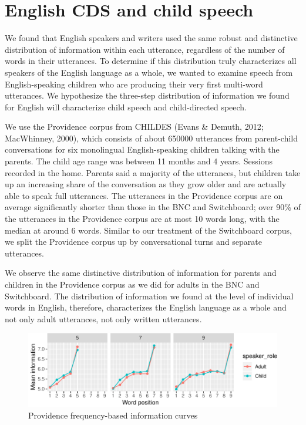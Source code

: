 \documentclass[11pt,]{article}
\begin{document}
\hypertarget{english-cds-and-child-speech}{%
\section{English CDS and child speech}\label{english-cds-and-child-speech}}

We found that English speakers and writers used the same robust and distinctive distribution of information within each utterance, regardless of the number of words in their utterances. To determine if this distribution truly characterizes all speakers of the English language as a whole, we wanted to examine speech from English-speaking children who are producing their very first multi-word utterances. We hypothesize the three-step distribution of information we found for English will characterize child speech and child-directed speech.

We use the Providence corpus from CHILDES (Evans \& Demuth, 2012; MacWhinney, 2000), which consists of about 650000 utterances from parent-child conversations for six monolingual English-speaking children talking with the parents. The child age range was between 11 months and 4 years. Sessions recorded in the home. Parents said a majority of the utterances, but children take up an increasing share of the conversation as they grow older and are actually able to speak full utterances. The utterances in the Providence corpus are on average significantly shorter than those in the BNC and Switchboard; over 90\% of the utterances in the Providence corpus are at most 10 words long, with the median at around 6 words. Similar to our treatment of the Switchboard corpus, we split the Providence corpus up by conversational turns and separate utterances.

We observe the same distinctive distribution of information for parents and children in the Providence corpus as we did for adults in the BNC and Switchboard. The distribution of information we found at the level of individual words in English, therefore, characterizes the English language as a whole and not only adult utterances, not only written utterances.

\begin{figure}
\centering
\includegraphics{paper_files/figure-latex/unnamed-chunk-1-1.pdf}
\caption{\label{fig:unnamed-chunk-1}Providence frequency-based information curves}
\end{figure}
\end{document}
